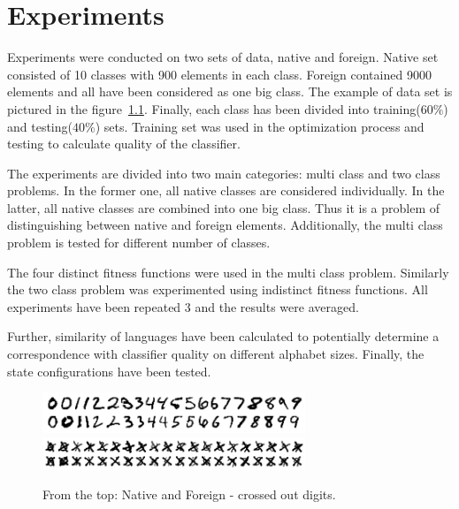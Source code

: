 \documentclass{mini}
\begin{document}
\chapter{Experiments}\label{chap:experiments}

Experiments were conducted on two sets of data, native and foreign. Native set consisted of 10 classes with 900 elements in each class. Foreign contained 9000 elements and all have been considered as one big class. The example of data set is pictured in the figure~\ref{fig:native_foreign_png}. Finally, each class has been divided into training($60\%$) and testing($40\%$) sets. Training set was used in the optimization process and testing to calculate quality of the classifier.

The experiments are divided into two main categories: multi class and two class problems. In the former one, all native classes are considered individually. In the latter, all native classes are combined into one big class. Thus it is a problem of distinguishing between native and foreign elements. Additionally, the multi class problem is tested for different number of classes.

The four distinct fitness functions were used in the multi class problem. Similarly the two class problem was experimented using indistinct fitness functions. All experiments have been repeated $3$ and the results were averaged.

Further, similarity of languages have been calculated to potentially determine a correspondence with classifier quality on different alphabet sizes. Finally, the state configurations have been tested.

\begin{figure}
    \includegraphics[width=0.7\textwidth]{./images/native.png}
    \includegraphics[width=0.7\textwidth]{./images/crossedout.png}
    \caption{From the top: Native and Foreign - crossed out digits.}
    \label{fig:native_foreign_png}
\end{figure}


\end{document}
